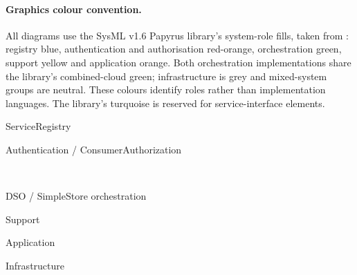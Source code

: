 \paragraph{Graphics colour convention.}
All diagrams use the SysML v1.6 Papyrus library's system-role fills, taken from
: registry blue, authentication
and authorisation red-orange, orchestration green, support yellow and application
orange. Both orchestration implementations share the library's combined-cloud
green; infrastructure is grey and mixed-system groups are neutral. These colours
identify roles rather than implementation languages. The library's turquoise is
reserved for service-interface elements.
\begin{center}\scriptsize
\setlength{\fboxsep}{4pt}
\colorbox{AHSysMLRegistry}{\strut ServiceRegistry}\quad
\colorbox{AHSysMLSecurity}{\strut Authentication / ConsumerAuthorization}\\[6pt]
\colorbox{AHSysMLOrchestration}{\strut DSO / SimpleStore orchestration}\quad
\colorbox{AHSysMLSupport}{\strut Support}\quad
\colorbox{AHSysMLApplication}{\strut Application}\quad
\colorbox{AHSysMLInfrastructure}{\strut Infrastructure}
\end{center}
%
%
